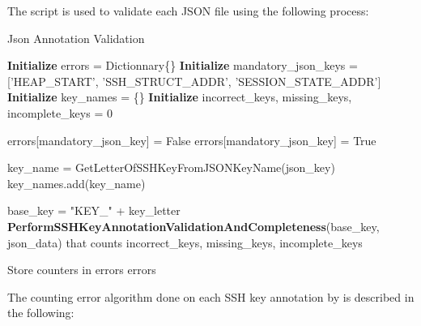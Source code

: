     The script is used to validate each JSON file using the following process:

    \begin{algorithm}[H]
        \caption{Json Annotation Validation}
        \begin{algorithmic}[1]
            \State \textbf{Initialize} errors = Dictionnary\{\} 
            \State \textbf{Initialize} mandatory\_json\_keys = ['HEAP\_START', 'SSH\_STRUCT\_ADDR', 'SESSION\_STATE\_ADDR']
            \State \textbf{Initialize} key\_names = \{\}
            \State \textbf{Initialize} incorrect\_keys, missing\_keys, incomplete\_keys = 0
            
             
                    \State errors[mandatory\_json\_key] = False
                \Else
                    \State errors[mandatory\_json\_key] = True
                \EndIf
            \EndFor
            
             
                    \State key\_name = GetLetterOfSSHKeyFromJSONKeyName(json\_key)
                    \State key\_names.add(key\_name)
                \EndIf
            \EndFor
            
                \State base\_key = "KEY\_" + key\_letter
                \State \textbf{PerformSSHKeyAnnotationValidationAndCompleteness}(base\_key, json\_data) that counts incorrect\_keys, missing\_keys, incomplete\_keys
            \EndFor
            
            \State Store counters in errors
            \State \Return errors
        \EndProcedure
        \end{algorithmic}
    \end{algorithm}

    The counting error algorithm done on each SSH key annotation by is described in the following:


